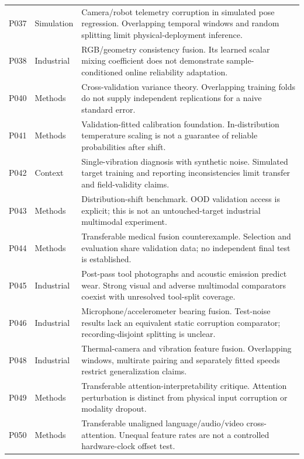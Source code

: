 \begin{longtable}{@{}P{.25\textwidth}P{.16\textwidth}P{.53\textwidth}@{}}
P037 \citep{Altinses2023Fuzzy} & Simulation & Camera/robot telemetry corruption in simulated pose regression. Overlapping temporal windows and random splitting limit physical-deployment inference. \\
P038 \citep{P038} & Industrial & RGB/geometry consistency fusion. Its learned scalar mixing coefficient does not demonstrate sample-conditioned online reliability adaptation. \\
P040 \citep{Bengio2004CVVariance} & Methods & Cross-validation variance theory. Overlapping training folds do not supply independent replications for a naive standard error. \\
P041 \citep{Guo2017Calibration} & Methods & Validation-fitted calibration foundation. In-distribution temperature scaling is not a guarantee of reliable probabilities after shift. \\
P042 \citep{P042} & Context & Single-vibration diagnosis with synthetic noise. Simulated target training and reporting inconsistencies limit transfer and field-validity claims. \\
P043 \citep{P043} & Methods & Distribution-shift benchmark. OOD validation access is explicit; this is not an untouched-target industrial multimodal experiment. \\
P044 \citep{P044} & Methods & Transferable medical fusion counterexample. Selection and evaluation share validation data; no independent final test is established. \\
P045 \citep{P045} & Industrial & Post-pass tool photographs and acoustic emission predict wear. Strong visual and adverse multimodal comparators coexist with unresolved tool-split coverage. \\
P046 \citep{P046} & Industrial & Microphone/accelerometer bearing fusion. Test-noise results lack an equivalent static corruption comparator; recording-disjoint splitting is unclear. \\
P048 \citep{P048} & Industrial & Thermal-camera and vibration feature fusion. Overlapping windows, multirate pairing and separately fitted speeds restrict generalization claims. \\
P049 \citep{P049} & Methods & Transferable attention-interpretability critique. Attention perturbation is distinct from physical input corruption or modality dropout. \\
P050 \citep{P050} & Methods & Transferable unaligned language/audio/video cross-attention. Unequal feature rates are not a controlled hardware-clock offset test. \\

\end{longtable}
